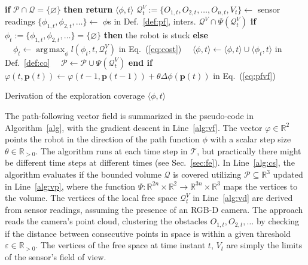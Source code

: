 \documentclass[letterpaper,10pt,conference,twoside]{IEEEtran}
\theoremstyle{definition}
\DeclareMathOperator*{\argmax}{arg\,max}
\begin{document}
\begin{algorithm}[t]
  \begin{algorithmic}[1]
    \small
      \STATE \textbf{if} $\mathcal{P}\cap\mathcal{Q}=\{\varnothing\}$ \textbf{then return }$\langle\phi,t\rangle$\vspace*{.3ex}\label{alg:cs}
      \STATE $\mathcal{Q}^V_t:=\{O_{1,t},O_{2,t},\dots,O_{n,t},V_t\}\gets$ sensor readings\label{alg:vd}\vspace*{.3ex}
      \vspace*{.3ex}
        \STATE $\{\phi_{1,t},\phi_{2,t},\dots\}\gets$ $\phi$s in Def.~\ref{def:pf}, inters. $\mathcal{Q}^V\cap \Psi(\mathcal{Q}^V_t)$\vspace*{-1.6ex}
        \STATE \textbf{if} $\phi_t:=\{\phi_{1,t},\phi_{2,t},\dots\}=\{\varnothing\}$ \textbf{then }the robot is stuck\label{alg:mpty}\vspace*{.3ex}
        \STATE \textbf{else}
        \STATE $\,\,\,\,\,\,\phi_t\gets \argmax_{\phi}l(\phi_t,t,\mathcal{Q}_t^V)$ in Eq.~(\ref{eq:cost})\label{alg:am}\vspace*{.3ex}
        \STATE $\,\,\,\,\,\,\langle\phi,t\rangle\gets\langle\phi,t\rangle\cup\langle\phi_t,t\rangle$ in Def.~\ref{def:co}\vspace*{.3ex}
        \STATE $\,\,\,\,\,\,\mathcal{P}\gets\mathcal{P}\cup \Psi(\mathcal{Q}_t^V)$\label{alg:vp}
        \STATE \textbf{end if}
        \vspace*{.3ex}
      \ENDIF
      \STATE $\varphi(t,\mathbf{p}(t))\gets\varphi(t-1,\mathbf{p}(t-1))+\theta\Delta\phi(\mathbf{p}(t))$ in Eq.~(\ref{eq:pfvf})\vspace*{.3ex}\label{alg:vf}
    \ENDFOR
  \end{algorithmic}
  \caption{Derivation of the exploration coverage $\langle\phi,t\rangle$}\label{alg}
\end{algorithm}

The path-following vector field is summarized in the pseudo-code in Algorithm~\ref{alg}, with the gradient descent in Line~\ref{alg:vf}. The vector $\varphi\in\mathbb{R}^2$ points the robot in the direction of the path function $\phi$ with a scalar step size $\theta\in\mathbb{R}_{>0}$. The algorithm runs at each time step in $\mathcal{T}$, %
but practically there might be different time steps at different times (see Sec.~\ref{sec:fe}). 
In Line~\ref{alg:cs}, the algorithm evaluates if the bounded volume $\mathcal{Q}$ is covered utilizing $\mathcal{P}\subseteq\mathbb{R}^3$ updated in Line~\ref{alg:vp}, where the function $\Psi:\mathbb{R}^{2n}\times\mathbb{R}^2\rightarrow\mathbb{R}^{3n}\times\mathbb{R}^3$ maps the vertices to the volume. The vertices of the local free space $\mathcal{Q}^V_t$ in Line~\ref{alg:vd} are derived from sensor readings, assuming the presence of an RGB-D camera. The %
approach reads the camera's point cloud, clustering the obstacles $O_{1,t},O_{2,t},\dots$ by checking if the distance between consecutive points in space is within a given threshold $\varepsilon\in\mathbb{R}_{>0}$. The vertices of the free space at time instant $t$, $V_t$ are simply the limits of the sensor's field of view.
\end{document}
